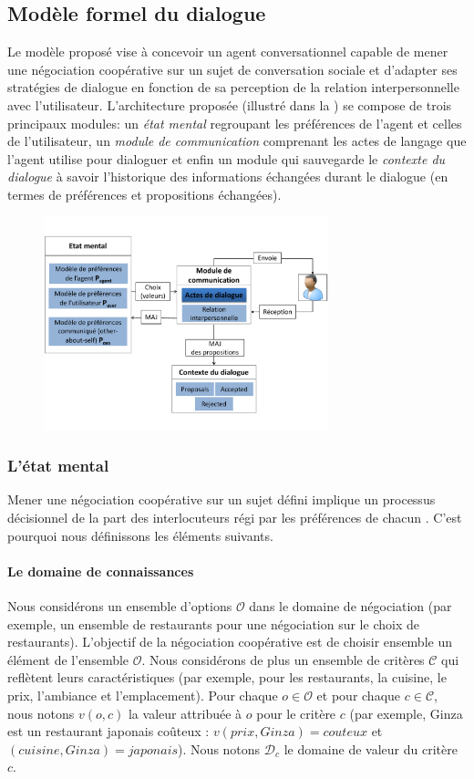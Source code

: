 \documentclass [french]{sig-alternate-05-2015}
\begin{document}
\subsection{Modèle formel du dialogue}
\par Le modèle proposé vise à concevoir un agent conversationnel capable de mener une négociation coopérative sur un sujet de conversation sociale et d'adapter ses stratégies de dialogue en fonction de sa perception de la relation interpersonnelle avec l'utilisateur. L'architecture proposée (illustré dans
 la ) se compose de trois principaux modules: un \textit{état mental} regroupant les préférences de l'agent et celles de l'utilisateur, un \textit{module de communication} comprenant les actes de langage que l'agent utilise pour dialoguer et enfin un module qui sauvegarde le \textit{contexte du dialogue} à savoir l'historique des informations échangées durant le dialogue (en termes de préférences et propositions échangées).
\begin{figure}
	\centerline{\includegraphics [width=3.25in]{figs/modele.pdf}}
\end{figure}

\subsubsection{L'état mental}

Mener une négociation coopérative sur un sujet défini implique un processus décisionnel de la part des interlocuteurs régi par les préférences de chacun \cite{laver1981linguistic}. C'est pourquoi nous définissons les éléments suivants.

\paragraph{Le domaine de connaissances}
Nous considérons un ensemble d'options $\mathcal{O}$ dans le domaine de négociation (par exemple, un ensemble de restaurants pour une négociation sur le choix de restaurants). L'objectif de la négociation coopérative est de choisir ensemble un élément de l'ensemble $\mathcal{O}$. Nous considérons de plus un ensemble de critères $\mathcal{C}$ qui reflètent leurs caractéristiques (par exemple, pour les restaurants, la cuisine, le prix, l'ambiance et l'emplacement). Pour chaque $o\in\mathcal{O}$ et pour chaque $c\in\mathcal{C}$, nous notons $v(o,c)$ la valeur attribuée à $o$ pour le critère $c$ (par exemple, Ginza est un restaurant japonais coûteux : $v(prix, Ginza) = couteux $ et $(cuisine, Ginza) = japonais$). Nous notons $\mathcal{D}_c$ le domaine de valeur du critère $c$.
\end{document}
